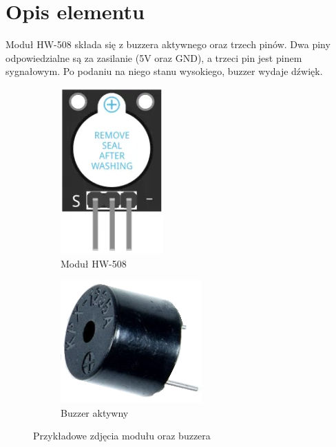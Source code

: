 \documentclass[11pt, a4paper]{article}
\author{Adam Rewekant}
\institute{Instytut Robotyki i Inteligencji Maszynowej}
\begin{document}

\newpage
\section*{Opis elementu} 
Moduł HW-508 składa się z buzzera aktywnego oraz trzech pinów. Dwa piny odpowiedzialne są za zasilanie (5V oraz GND), a trzeci pin jest pinem sygnałowym. Po podaniu na niego stanu wysokiego, buzzer wydaje dźwięk.

\vspace{0.5cm}
\begin{figure}[h]
\centering
\begin{subfigure}{.5\textwidth}
  \centering
  \includegraphics[width=.4\linewidth]{fig/obrazki/buzzer/buzzer2.png}
  \caption{Moduł HW-508 \cite{zdjecia}}
  \label{fig:sub1}
\end{subfigure}%
\begin{subfigure}{.5\textwidth}
  \centering
  \includegraphics[width=.6\linewidth]{fig/obrazki/buzzer/buzzer_sam.png}
  \caption{Buzzer aktywny \cite{budowa}}
  \label{fig:sub2}
\end{subfigure}
\caption{Przykładowe zdjęcia modułu oraz buzzera}
\label{fig:test}
\end{figure}
\vspace{0.5cm}
\end{document}

